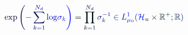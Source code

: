 \documentclass[12pt]{article}
\begin{document}
\makeatletter
\renewcommand*{\@textcolor}[3]{%
  \protect\leavevmode
  \begingroup
    \color#1{#2}#3%
  \endgroup
}
\makeatother
\begin{displaymath}
\mathrm { \mathcolor[RGB]{0,0,15}{e} \mathcolor[RGB]{0,0,30}{x} \mathcolor[RGB]{0,0,45}{p} } \mathcolor[RGB]{0,0,60}{\left(} \mathcolor[RGB]{0,0,75}{-} \mathcolor[RGB]{0,0,90}{\sum} _ { \mathcolor[RGB]{0,0,105}{k} \mathcolor[RGB]{0,0,120}{=} \mathcolor[RGB]{0,0,135}{1} } ^ { \mathcolor[RGB]{0,0,150}{N} _ { \mathcolor[RGB]{0,0,165}{d} } } \mathrm { \mathcolor[RGB]{0,0,180}{l} \mathcolor[RGB]{0,0,195}{o} \mathcolor[RGB]{0,0,210}{g} } \mathcolor[RGB]{0,0,225}{\sigma} _ { \mathcolor[RGB]{0,0,240}{k} } \mathcolor[RGB]{0,0,255}{\right)} \mathcolor[RGB]{0,15,0}{=} \mathcolor[RGB]{0,15,15}{\prod} _ { \mathcolor[RGB]{0,15,30}{k} \mathcolor[RGB]{0,15,45}{=} \mathcolor[RGB]{0,15,60}{1} } ^ { \mathcolor[RGB]{0,15,75}{N} _ { \mathcolor[RGB]{0,15,90}{d} } } \mathcolor[RGB]{0,15,105}{\sigma} _ { \mathcolor[RGB]{0,15,120}{k} } ^ { \mathcolor[RGB]{0,15,135}{-} \mathcolor[RGB]{0,15,150}{1} } \mathcolor[RGB]{0,15,165}{\in} \mathcolor[RGB]{0,15,180}{L} _ { \mathcolor[RGB]{0,15,195}{\mu} _ { \mathcolor[RGB]{0,15,210}{0} } } ^ { \mathcolor[RGB]{0,15,225}{1} } \mathcolor[RGB]{0,15,240}{(} \mathcal { \mathcolor[RGB]{0,15,255}{H} } _ { \mathcolor[RGB]{0,30,0}{u} } \mathcolor[RGB]{0,30,15}{\times} \mathbb { \mathcolor[RGB]{0,30,30}{R} } ^ { \mathcolor[RGB]{0,30,45}{+} } \mathcolor[RGB]{0,30,60}{;} \mathbb { \mathcolor[RGB]{0,30,75}{R} } \mathcolor[RGB]{0,30,90}{)}
\end{displaymath}
\end{document}
